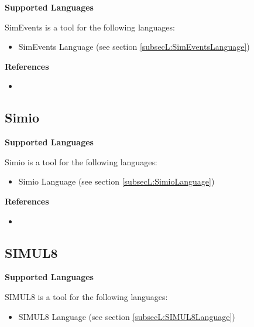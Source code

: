 
\textbf{Supported Languages}

SimEvents is a tool for the following languages:
\begin{itemize}
	\item SimEvents Language (see section \ref{subsecL:SimEventsLanguage})
\end{itemize}


\textbf{References}
\begin{itemize}
	
\item {}
\end{itemize}



\subsection{Simio}
\label{subsecT:Simio}



\textbf{Supported Languages}

Simio is a tool for the following languages:
\begin{itemize}
	\item Simio Language (see section \ref{subsecL:SimioLanguage})
\end{itemize}


\textbf{References}
\begin{itemize}
	
\item {}
\end{itemize}



\subsection{SIMUL8}
\label{subsecT:SIMUL8}



\textbf{Supported Languages}

SIMUL8 is a tool for the following languages:
\begin{itemize}
	\item SIMUL8 Language (see section \ref{subsecL:SIMUL8Language})
\end{itemize}


